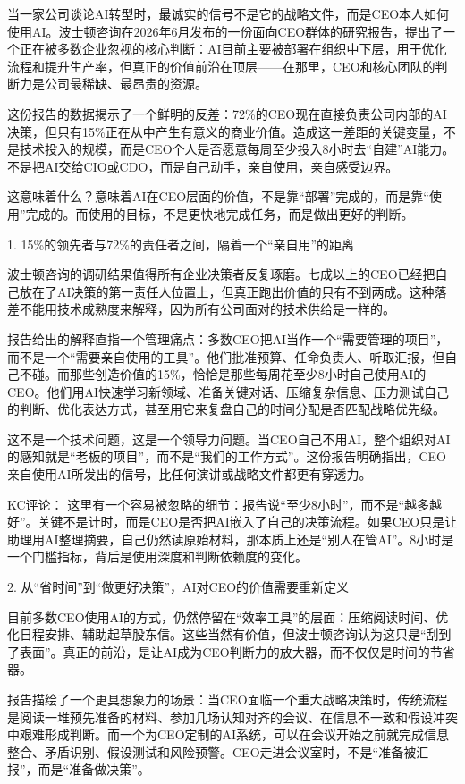 \documentclass[11pt]{ctexart}
\begin{document}
当一家公司谈论AI转型时，最诚实的信号不是它的战略文件，而是CEO本人如何使用AI。波士顿咨询在2026年6月发布的一份面向CEO群体的研究报告，提出了一个正在被多数企业忽视的核心判断：AI目前主要被部署在组织中下层，用于优化流程和提升生产率，但真正的价值前沿在顶层——在那里，CEO和核心团队的判断力是公司最稀缺、最昂贵的资源。

这份报告的数据揭示了一个鲜明的反差：72\%的CEO现在直接负责公司内部的AI决策，但只有15\%正在从中产生有意义的商业价值。造成这一差距的关键变量，不是技术投入的规模，而是CEO个人是否愿意每周至少投入8小时去“自建”AI能力。不是把AI交给CIO或CDO，而是自己动手，亲自使用，亲自感受边界。

这意味着什么？意味着AI在CEO层面的价值，不是靠“部署”完成的，而是靠“使用”完成的。而使用的目标，不是更快地完成任务，而是做出更好的判断。

1. 15\%的领先者与72\%的责任者之间，隔着一个“亲自用”的距离

波士顿咨询的调研结果值得所有企业决策者反复琢磨。七成以上的CEO已经把自己放在了AI决策的第一责任人位置上，但真正跑出价值的只有不到两成。这种落差不能用技术成熟度来解释，因为所有公司面对的技术供给是一样的。

报告给出的解释直指一个管理痛点：多数CEO把AI当作一个“需要管理的项目”，而不是一个“需要亲自使用的工具”。他们批准预算、任命负责人、听取汇报，但自己不碰。而那些创造价值的15\%，恰恰是那些每周花至少8小时自己使用AI的CEO。他们用AI快速学习新领域、准备关键对话、压缩复杂信息、压力测试自己的判断、优化表达方式，甚至用它来复盘自己的时间分配是否匹配战略优先级。

这不是一个技术问题，这是一个领导力问题。当CEO自己不用AI，整个组织对AI的感知就是“老板的项目”，而不是“我们的工作方式”。这份报告明确指出，CEO亲自使用AI所发出的信号，比任何演讲或战略文件都更有穿透力。

KC评论： 这里有一个容易被忽略的细节：报告说“至少8小时”，而不是“越多越好”。关键不是计时，而是CEO是否把AI嵌入了自己的决策流程。如果CEO只是让助理用AI整理摘要，自己仍然读原始材料，那本质上还是“别人在管AI”。8小时是一个门槛指标，背后是使用深度和判断依赖度的变化。

2. 从“省时间”到“做更好决策”，AI对CEO的价值需要重新定义

目前多数CEO使用AI的方式，仍然停留在“效率工具”的层面：压缩阅读时间、优化日程安排、辅助起草股东信。这些当然有价值，但波士顿咨询认为这只是“刮到了表面”。真正的前沿，是让AI成为CEO判断力的放大器，而不仅仅是时间的节省器。

报告描绘了一个更具想象力的场景：当CEO面临一个重大战略决策时，传统流程是阅读一堆预先准备的材料、参加几场认知对齐的会议、在信息不一致和假设冲突中艰难形成判断。而一个为CEO定制的AI系统，可以在会议开始之前就完成信息整合、矛盾识别、假设测试和风险预警。CEO走进会议室时，不是“准备被汇报”，而是“准备做决策”。
\end{document}
